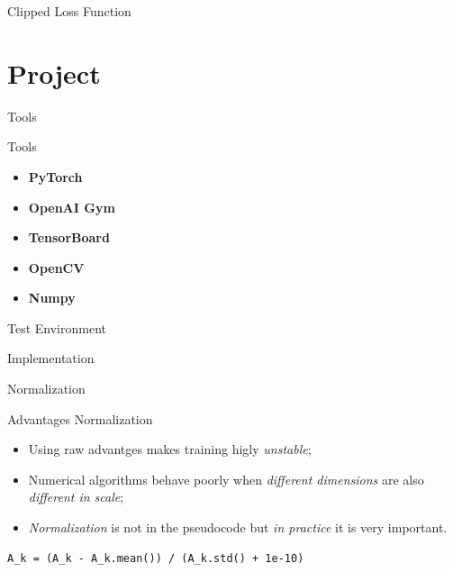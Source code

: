 \documentclass[presentation]{beamer}\mode<presentation>{\usetheme{AMSBolognaFC}}
\begin{document}
\begin{frame}{Clipped Loss Function}
	
	
\end{frame}


\section{Project}

\begin{frame}{Tools}
\begin{block}{Tools}
	\begin{itemize}
		\item \textbf{PyTorch}
		\item \textbf{OpenAI Gym}
		\item \textbf{TensorBoard}
		\item \textbf{OpenCV}
		\item \textbf{Numpy}
	\end{itemize}
\end{block}
\end{frame}

\begin{frame}{Test Environment}


\end{frame}

\begin{frame}{Implementation}


\end{frame}

\begin{frame}[fragile]{Normalization}
\begin{block}{Advantages Normalization}
	\begin{itemize}
		\item Using raw advantges makes training higly \emph{unstable};
		\item Numerical algorithms behave poorly when \emph{different dimensions} 
			are also \emph{different in scale};
		\item \emph{Normalization} is not in the pseudocode but \emph{in practice} it is very important.
	\end{itemize}
\end{block}

\begin{lstlisting}
A_k = (A_k - A_k.mean()) / (A_k.std() + 1e-10)
\end{lstlisting}

\end{frame}
\end{document}
